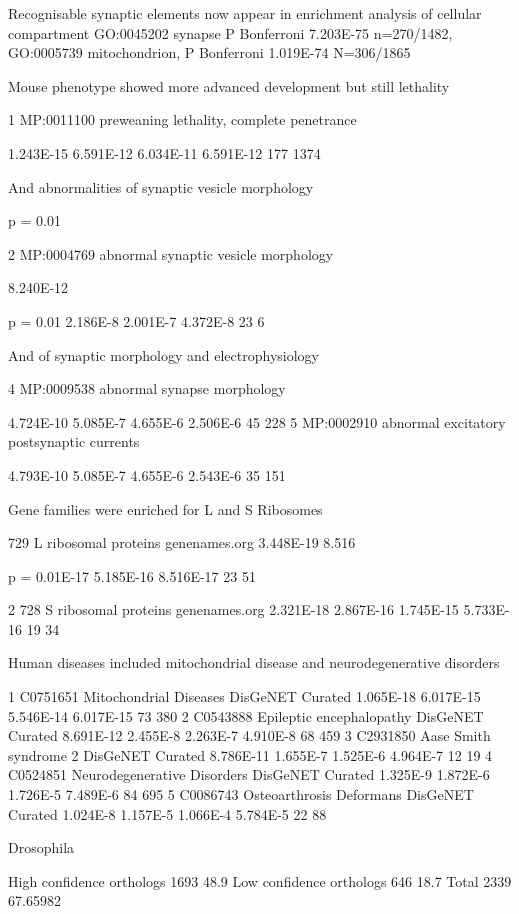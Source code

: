 Recognisable synaptic elements now appear in enrichment analysis of cellular compartment GO:0045202 synapse P Bonferroni 7.203E-75 n=270/1482, 
GO:0005739 mitochondrion, P Bonferroni 1.019E-74 N=306/1865


Mouse phenotype showed more advanced development but still lethality

1 
MP:0011100 
preweaning lethality, complete penetrance 

1.243E-15 
6.591E-12 
6.034E-11 
6.591E-12 
177 
1374

And abnormalities of synaptic vesicle morphology


p = 0.01

2 
MP:0004769 
abnormal synaptic vesicle morphology 

8.240E-12

p = 0.01 
2.186E-8 
2.001E-7 
4.372E-8 
23 
6

And of synaptic morphology and electrophysiology


4 
MP:0009538 
abnormal synapse morphology 

4.724E-10 
5.085E-7 
4.655E-6 
2.506E-6 
45 
228 
5 
MP:0002910 
abnormal excitatory postsynaptic currents 

4.793E-10 
5.085E-7 
4.655E-6 
2.543E-6 
35 
151


Gene families were enriched for L and S Ribosomes


729 
L ribosomal proteins 
genenames.org 
3.448E-19 
8.516

p = 0.01E-17 
5.185E-16 
8.516E-17 
23 
51 

2 
728 
S ribosomal proteins 
genenames.org 
2.321E-18 
2.867E-16 
1.745E-15 
5.733E-16 
19 
34


Human diseases included mitochondrial disease and neurodegenerative disorders


1 
C0751651 
Mitochondrial Diseases 
DisGeNET Curated 
1.065E-18 
6.017E-15 
5.546E-14 
6.017E-15 
73 
380 
2 
C0543888 
Epileptic encephalopathy 
DisGeNET Curated 
8.691E-12 
2.455E-8 
2.263E-7 
4.910E-8 
68 
459 
3 
C2931850 
Aase Smith syndrome 2 
DisGeNET Curated 
8.786E-11 
1.655E-7 
1.525E-6 
4.964E-7 
12 
19 
4 
C0524851 
Neurodegenerative Disorders 
DisGeNET Curated 
1.325E-9 
1.872E-6 
1.726E-5 
7.489E-6 
84 
695 
5 
C0086743 
Osteoarthrosis Deformans 
DisGeNET Curated 
1.024E-8 
1.157E-5 
1.066E-4 
5.784E-5 
22 
88

Drosophila

High confidence orthologs 1693 	48.9%
Low confidence orthologs 646	18.7%
Total 2339				67.65982%

